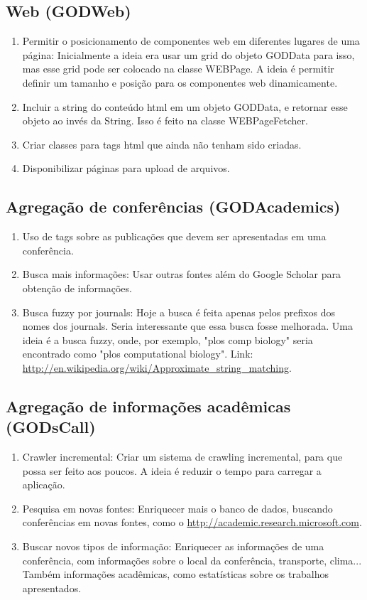 \subsection{Web (GODWeb)}
\begin{enumerate}
\item Permitir o posicionamento de componentes web em diferentes lugares de uma página: Inicialmente a ideia era usar um grid do objeto GODData para isso, mas esse grid pode ser colocado na classe WEBPage. A ideia é permitir definir um tamanho e posição para os componentes web dinamicamente.
\item Incluir a string do conteúdo html em um objeto GODData, e retornar esse objeto ao invés da String. Isso é feito na classe WEBPageFetcher.
\item Criar classes para tags html que ainda não tenham sido criadas.
\item Disponibilizar páginas para upload de arquivos.
\end{enumerate}

\subsection{Agregação de conferências (GODAcademics)}
\begin{enumerate}
\item Uso de tags sobre as publicações que devem ser apresentadas em uma conferência.
\item Busca mais informações: Usar outras fontes além do Google Scholar para obtenção de informações.
\item Busca fuzzy por journals: Hoje a busca é feita apenas pelos prefixos dos nomes dos journals. Seria interessante que essa busca fosse melhorada. Uma ideia é a busca fuzzy, onde, por exemplo, "plos comp biology" seria encontrado como "plos computational biology". Link: \url{http://en.wikipedia.org/wiki/Approximate_string_matching}.
\end{enumerate}

\subsection{Agregação de informações acadêmicas (GODsCall)}
\begin{enumerate}
\item Crawler incremental: Criar um sistema de crawling incremental, para que possa ser feito aos poucos. A ideia é reduzir o tempo para carregar a aplicação.
\item Pesquisa em novas fontes: Enriquecer mais o banco de dados, buscando conferências em novas fontes, como o \url{http://academic.research.microsoft.com}.
\item Buscar novos tipos de informação: Enriquecer as informações de uma conferência, com informações sobre o local da conferência, transporte, clima... Também informações acadêmicas, como estatísticas sobre os trabalhos apresentados.
\end{enumerate}

